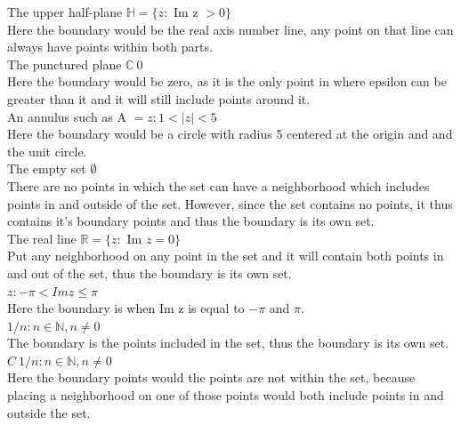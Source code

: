 \documentclass[12pt]{article}
\begin{document}
 The upper half-plane $\mathbb{H} = \{z:$ Im z $ > 0\}$\\

Here the boundary would be the real axis number line, any point on that line can always have points within both parts.\\


 The punctured plane $\mathbb{C}\ {0}$ \\

Here the boundary would be zero, as it is the only point in where epsilon can be greater than it and it will still include points around it.\\

 An annulus such as A $ = {z: 1 < |z| < 5}$\\

Here the boundary would be a circle with radius 5 centered at the origin and and the unit circle.\\

 The empty set $\emptyset$ \\

There are no points in which the set can have a neighborhood which includes points in and outside of the set.
However, since the set contains no points, it thus contains it's boundary points and thus the boundary is its own set.\\

 The real line $\mathbb{R} = \{z: $ Im $z = 0\}$\\

Put any neighborhood on any point in the set and it will contain both points in and out of the set, thus the boundary is its own set.\\

 ${z: -\pi < Im z \leq \pi}$\\

Here the boundary is when Im z is equal to $-\pi$ and $\pi$.\\

 ${1/n: n \in \mathbb{N}, n \neq 0}$\\

The boundary is the points included in the set, thus the boundary is its own set.\\

 $C \ {1/n: n \in \mathbb{N}, n \neq 0}$\\

Here the boundary points would the points are not within the set, because placing a neighborhood on one of those points would both include points in and outside the set.\\
\end{document}
